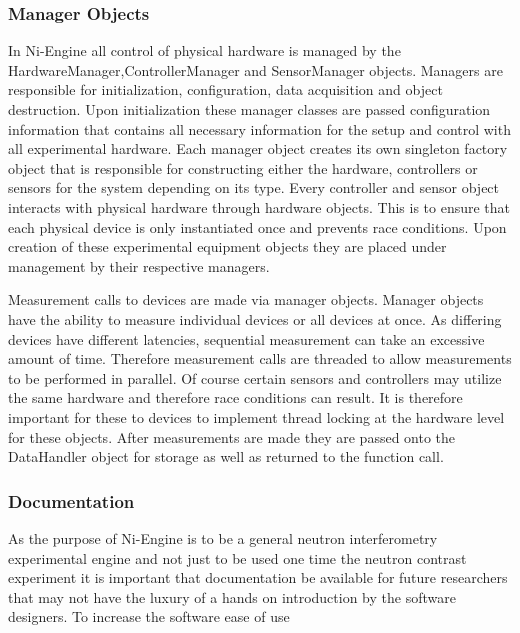 \subsubsection{Manager Objects}
In Ni-Engine all control of physical hardware is managed by the HardwareManager,ControllerManager and SensorManager objects. Managers are responsible for initialization, configuration, data acquisition and object destruction. Upon initialization these manager classes are passed configuration information that contains all necessary information for the setup and control with all experimental hardware. Each manager object creates its own singleton factory object that is responsible for constructing either the hardware, controllers or sensors for the system depending on its type. Every controller and sensor object interacts with physical hardware through hardware objects. This is to ensure that each physical device is only instantiated once and prevents race conditions. Upon creation of these experimental equipment objects they are placed under management by their respective managers. 

Measurement calls to devices are made via manager objects. Manager objects have the ability to measure individual devices or all devices at once. As differing devices have different latencies, sequential measurement can take an excessive amount of time. Therefore measurement calls are threaded to allow measurements to be performed in parallel. Of course certain sensors and controllers may utilize the same hardware and therefore race conditions can result. It is therefore important for these to devices to implement thread locking at the hardware level for these objects. After measurements are made they are passed onto the DataHandler object for storage as well as returned to the function call. 
\subsubsection{Documentation}
As the purpose of Ni-Engine is to be a general neutron interferometry experimental engine and not just to be used one time the neutron contrast experiment it is important that documentation be available for future researchers that may not have the luxury of a hands on introduction by the software designers. To increase the software ease of use

